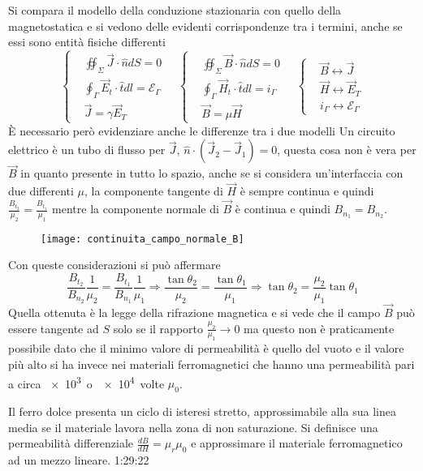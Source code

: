 Si compara il modello della conduzione stazionaria con quello della magnetostatica
e si vedono delle evidenti corrispondenze tra i termini, anche se essi sono entità fisiche 
differenti
$$
\left\{\begin{aligned}
&\oiint_\Sigma \vec{J}\cdot\hat{n}dS = 0\\
& \oint_\Gamma \vec{E}_t\cdot\hat{t}dl = \mathcal{E}_\Gamma \\
&\vec{J} = \gamma \vec{E}_T
\end{aligned}
\right.
\quad
\left\{\begin{aligned}
&\oiint_\Sigma \vec{B}\cdot\hat{n}dS = 0\\
& \oint_\Gamma \vec{H}_t\cdot\hat{t}dl = i_\Gamma \\
&\vec{B} = \mu \vec{H}
\end{aligned}
\right.
\quad
\left\{\begin{aligned}
&\vec{B} \leftrightarrow \vec{J}\\
&\vec{H} \leftrightarrow \vec{E}_T \\
& i_\Gamma \leftrightarrow \mathcal{E}_\Gamma
\end{aligned}
\right.
$$
È necessario però evidenziare anche le differenze tra i due modelli
Un circuito elettrico è un tubo di flusso per $\vec{J}$, 
$\hat{n}\cdot(\vec{J}_2-\vec{J}_1) = 0$, questa cosa non è vera per $\vec{B}$ in quanto
presente in tutto lo spazio, anche se si considera un'interfaccia con due differenti $\mu$,
la componente tangente di $\vec{H}$ è sempre continua e quindi $\frac{B_{t_2}}{\mu_2} = \frac{B_{t_1}}{\mu_1}$ mentre la componente normale di $\vec{B}$ è continua e quindi $B_{n_1} = B_{n_2}$.
\begin{figure}[H]
\centering
\texttt{[image: continuita\_campo\_normale\_B]}
\end{figure}
Con queste considerazioni si può affermare
$$
\frac{B_{t_2}}{B_{n_2}}\frac{1}{\mu_2} = \frac{B_{t_1}}{B_{n_1}}\frac{1}{\mu_1} \Rightarrow 
\frac{\tan \theta_2}{\mu_2} = \frac{\tan\theta_1}{\mu_1}\Rightarrow \tan\theta_2 = \frac{\mu_2}{\mu_1}\tan\theta_1
$$
Quella ottenuta è la legge della rifrazione magnetica e si vede che il campo $\vec{B}$ può
essere tangente ad $S$ solo se il rapporto $\frac{\mu_2}{\mu_1}\to 0$ ma questo non è 
praticamente possibile dato che il minimo valore di permeabilità è quello del vuoto
e il valore più alto si ha invece nei materiali ferromagnetici che hanno una permeabilità
pari a circa \SI{e3} o \SI{e4} volte $\mu_0$.
\newpage

Il ferro dolce presenta un ciclo di isteresi stretto, approssimabile alla sua
linea media se il materiale lavora nella zona di non saturazione. Si definisce una 
permeabilità differenziale $\frac{dB}{dH} = \mu_r\mu_0$ e approssimare il materiale
ferromagnetico ad un mezzo lineare.
1:29:22
